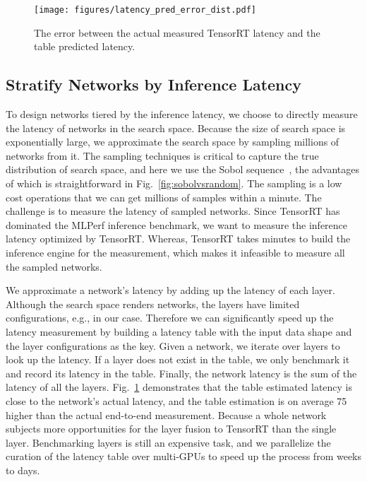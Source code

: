 \documentclass[10pt,twocolumn,letterpaper]{article}
\begin{document}
\begin{figure}[t]
\centering 
\vspace{-0.5cm}
  \begin{center}
    \texttt{[image: figures/latency\_pred\_error\_dist.pdf]}
  \end{center}
    \caption{The error between the actual measured TensorRT latency and the table predicted latency.}
    \label{fig:table_actual_latency}
    \vspace{-0.5cm}
\end{figure}


\subsection{Stratify Networks by Inference Latency}
\label{sec:gen_search_space}

To design networks tiered by the inference latency, we choose to directly measure the latency of networks in the search space. Because the size of search space is exponentially large, we approximate the search space by sampling millions of networks from it. The sampling techniques is critical to capture the true distribution of search space, and here we use the Sobol sequence~\cite{sobolseq}, the advantages of which is straightforward in Fig.~\ref{fig:sobolvsrandom}. The sampling is a low cost operations that we can get millions of samples within a minute. The challenge is to measure the latency of sampled networks. Since TensorRT has dominated the MLPerf inference benchmark, we want to measure the inference latency optimized by TensorRT. Whereas, TensorRT takes minutes to build the inference engine for the measurement, which makes it infeasible to measure all the sampled networks.

We approximate a network's latency by adding up the latency of each layer. Although the search space renders  networks, the layers have limited configurations, e.g.,  in our case. Therefore we can significantly speed up the latency measurement by building a latency table with the input data shape and the layer configurations as the key. Given a network, we iterate over layers to look up the latency. If a layer does not exist in the table, we only benchmark it and record its latency in the table. Finally, the network latency is the sum of the latency of all the layers. Fig.~\ref{fig:table_actual_latency} demonstrates that the table estimated latency is close to the network's actual latency, and the table estimation is on average 75 higher than the actual end-to-end measurement. Because a whole network subjects more opportunities for the layer fusion to TensorRT than the single layer. Benchmarking  layers is still an expensive task, and we parallelize the curation of the latency table over multi-GPUs to speed up the process from weeks to days.
\end{document}
